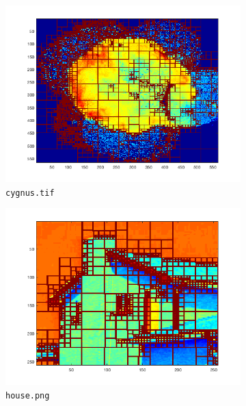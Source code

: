 \documentclass[a4paper]{article}
\begin{document}
\begin{figure}[H]
    \centering
     
    \begin{subfigure}[c]{0.6\textwidth}
        \centering
        \includegraphics[width=\textwidth]{images/ex1_cygnus.png}
        \caption{\texttt{cygnus.tif}}
    \label{subfig:ex1_cygnus}
    \end{subfigure}
    \begin{subfigure}[c]{0.6\textwidth}
        \centering
        \includegraphics[width=\textwidth]{images/ex1_house.png}
        \caption{\texttt{house.png}}
        \label{subfig:ex1_house}
    \end{subfigure}
    \begin{subfigure}[c]{0.6\textwidth}

\end{subfigure}
\end{figure}
\end{document}
